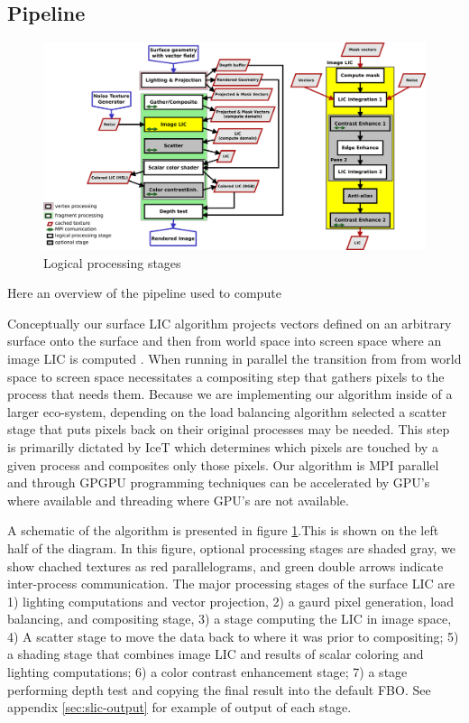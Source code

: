 \documentclass[a4paper,10pt]{article}
\begin{document}
\subsection{Pipeline}
\begin{figure}[ht]
 \centering
 \includegraphics[width=\textwidth]{./images-data/dia-serial/surfacelic-painter-and-lic2d-flow.png}
 \caption{Logical processing stages}
 \label{fig:flow}
\end{figure}

Here an overview of the pipeline used to compute 

Conceptually our surface LIC algorithm projects vectors defined on an arbitrary surface onto the surface and then from world space into screen space where an image LIC is computed\cite{surfacelic} \cite{imagelic}. When running in parallel the transition from from world space to screen space necessitates a compositing step that gathers pixels to the process that needs them. Because we are implementing our algorithm inside of a larger eco-system, depending on the load balancing algorithm selected a scatter stage that puts pixels back on their original processes may be needed. This step is primarilly dictated by IceT which determines which pixels are touched by a given process and composites only those pixels. Our algorithm is MPI parallel and through GPGPU programming techniques can be accelerated by GPU's where available and threading where GPU's are not available\cite{xsede13}.

A schematic of the algorithm is presented in figure \ref{fig:flow}.This is shown on the left half of the diagram. In this figure, optional processing stages are shaded gray, we show chached textures as red parallelograms, and green double arrows indicate inter-process communication. The major processing stages of the surface LIC are 1) lighting computations and vector projection, 2) a gaurd pixel generation, load balancing, and compositing stage, 3) a stage computing the LIC in image space, 4) A scatter stage to move the data back to where it was prior to compositing; 5) a shading stage that combines image LIC and results of scalar coloring and lighting computations; 6) a color contrast enhancement stage; 7) a stage performing depth test and copying the final result into the default FBO. See appendix \ref{sec:slic-output} for example of output of each stage.
\end{document}
